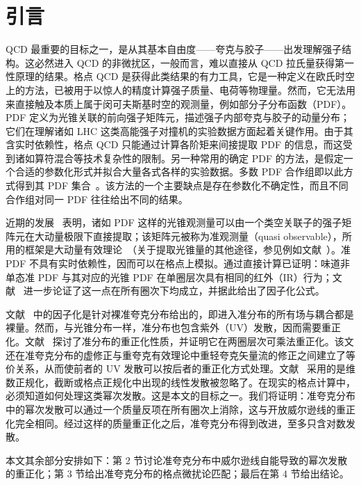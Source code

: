 \section{引言}

QCD 最重要的目标之一，是从其基本自由度——夸克与胶子——出发理解强子结构。这必然进入 QCD 的非微扰区，一般而言，难以直接从 QCD 拉氏量获得第一性原理的结果。格点 QCD 是获得此类结果的有力工具，它是一种定义在欧氏时空上的方法，已被用于以惊人的精度计算强子质量、电荷等物理量。然而，它无法用来直接触及本质上属于闵可夫斯基时空的观测量，例如部分子分布函数（PDF）。PDF 定义为光锥关联的前向强子矩阵元，描述强子内部夸克与胶子的动量分布；它们在理解诸如 LHC 这类高能强子对撞机的实验数据方面起着关键作用。由于其含实时依赖性，格点 QCD 只能通过计算各阶矩来间接提取 PDF 的信息，而这受到诸如算符混合等技术复杂性的限制。另一种常用的确定 PDF 的方法，是假定一个合适的参数化形式并拟合大量各式各样的实验数据。多数 PDF 合作组即以此方式得到其 PDF 集合~\cite{Alekhin:2012ig,Gao:2013xoa,Radescu:2010zz,CooperSarkar:2011aa,Martin:2009iq,Ball:2012cx}。该方法的一个主要缺点是存在参数化不确定性，而且不同合作组对同一 PDF 往往给出不同的结果。


近期的发展~\cite{Ji:2013fga,Ji:2013dva,Xiong:2013bka,Lin:2014zya,Hatta:2013gta,Ma:2014jla,Ji:2014hxa,Ji:2014gla,Ji:2014lra,
Alexandrou:2015rja,Ji:2015jwa,Ji:2015qla,Xiong:2015nua,Li:2016amo,Chen:2016utp} 表明，诸如 PDF 这样的光锥观测量可以由一个类空关联子的强子矩阵元在大动量极限下直接提取；该矩阵元被称为准观测量（quasi observable），所用的框架是大动量有效理论~\cite{Ji:2014lra}（关于提取光锥量的其他途径，参见例如文献~\cite{Davoudi:2012ya,Detmold:2005gg,Liu:1993cv,Liu:1998um,Liu:1999ak,Liu:2016djw,Braun:2007wv}）。准 PDF 不具有实时依赖性，因而可以在格点上模拟。通过直接计算已证明：味道非单态准 PDF 与其对应的光锥 PDF 在单圈层次具有相同的红外（IR）行为；文献~\cite{Xiong:2013bka} 进一步论证了这一点在所有圈次下均成立，并据此给出了因子化公式。

文献~\cite{Xiong:2013bka} 中的因子化是针对裸准夸克分布给出的，即进入准分布的所有场与耦合都是裸量。然而，与光锥分布一样，准分布也包含紫外（UV）发散，因而需要重正化。文献~\cite{Ji:2015jwa} 探讨了准分布的重正化性质，并证明它在两圈层次可乘法重正化。该文还在准夸克分布的虚修正与重夸克有效理论中重轻夸克矢量流的修正之间建立了等价关系，从而使前者的 UV 发散可以按后者的重正化方式处理。文献~\cite{Ji:2015jwa} 采用的是维数正规化，截断或格点正规化中出现的线性发散被忽略了。在现实的格点计算中，必须知道如何处理这类幂次发散。这是本文的目标之一。我们将证明：准夸克分布中的幂次发散可以通过一个质量反项在所有圈次上消除，这与开放威尔逊线的重正化完全相同。经过这样的质量重正化之后，准夸克分布得到改进，至多只含对数发散。

本文其余部分安排如下：第 2 节讨论准夸克分布中威尔逊线自能导致的幂次发散的重正化；第 3 节给出准夸克分布的格点微扰论匹配；最后在第 4 节给出结论。
